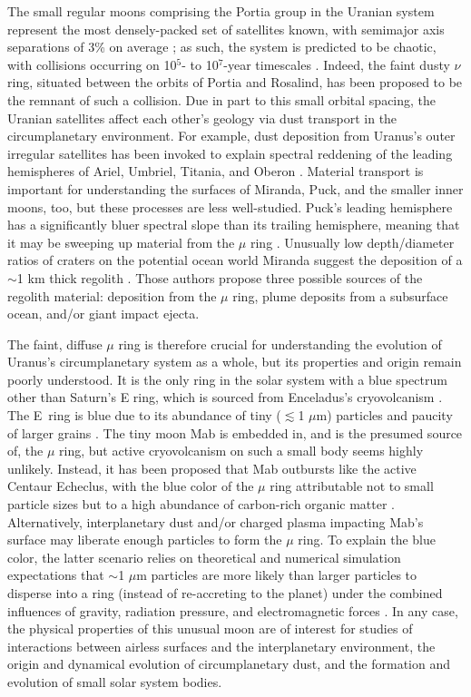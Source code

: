 \documentclass[preprint]{aastex631}
\begin{document}
The small regular moons comprising the Portia group in the Uranian system represent the most densely-packed set of satellites known, with semimajor axis separations of 3\% on average \citep{showalter20}; as such, the system is predicted to be chaotic, with collisions occurring on 10$^5$- to 10$^7$-year timescales \citep{duncan97, french12}. Indeed, the faint dusty $\nu$ ring, situated between the orbits of Portia and Rosalind, has been proposed to be the remnant of such a collision. Due in part to this small orbital spacing, the Uranian satellites affect each other's geology via dust transport in the circumplanetary environment. For example, dust deposition from Uranus's outer irregular satellites has been invoked to explain spectral reddening of the leading hemispheres of Ariel, Umbriel, Titania, and Oberon \citep{cartwright18}. Material transport is important for understanding the surfaces of Miranda, Puck, and the smaller inner moons, too, but these processes are less well-studied. 
Puck's leading hemisphere has a significantly bluer spectral slope than its trailing hemisphere, meaning that it may be sweeping up material from the $\mu$ ring \citep{french17}. %
Unusually low depth/diameter ratios of craters on the potential ocean world Miranda suggest the deposition of a $\sim$1 km thick regolith \citep{cartwright21, beddingfield22}. Those authors propose three possible sources of the regolith material: deposition from the $\mu$ ring, plume deposits from a subsurface ocean, and/or giant impact ejecta.

The faint, diffuse $\mu$ ring is therefore crucial for understanding the evolution of Uranus's circumplanetary system as a whole, but its properties and origin remain poorly understood.
It is the only ring in the solar system with a blue spectrum other than Saturn's E ring, which is sourced from Enceladus's cryovolcanism \citep{depater06}. The E~ring is blue due to its abundance of tiny ($\lesssim$1 $\mu$m) particles and paucity of larger grains \citep{showalter91, depater04, hillier07}. The tiny moon Mab is embedded in, and is the presumed source of, the $\mu$ ring, but active cryovolcanism on such a small body seems highly unlikely. Instead, it has been proposed that Mab outbursts like the active Centaur Echeclus, with the blue color of the $\mu$ ring attributable not to small particle sizes but to a high abundance of carbon-rich organic matter \citep{seccull19}. Alternatively, interplanetary dust and/or charged plasma impacting Mab's surface may liberate enough particles to form the $\mu$ ring. To explain the blue color, the latter scenario relies on theoretical and numerical simulation expectations that $\sim$1 $\mu$m particles are more likely than larger particles to disperse into a ring (instead of re-accreting to the planet) under the combined influences of gravity, radiation pressure, and electromagnetic forces \citep{horanyi92, sfair09, sfair12}. In any case, the physical properties of this unusual moon are of interest for studies of interactions between airless surfaces and the interplanetary environment, the origin and dynamical evolution of circumplanetary dust, and the formation and evolution of small solar system bodies.
\end{document}
